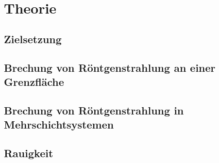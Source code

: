 \section{Theorie}
\label{sec:Theorie}

\subsection{Zielsetzung}
\label{subsec:zielsetzung}


\subsection{Brechung von Röntgenstrahlung an einer Grenzfläche}
\label{subsec:einschicht}









\subsection{Brechung von Röntgenstrahlung in Mehrschichtsystemen}
\label{subsec:mehrschicht}





\subsection{Rauigkeit}
\label{subsec:rauigkeit}





\cite{sample}
